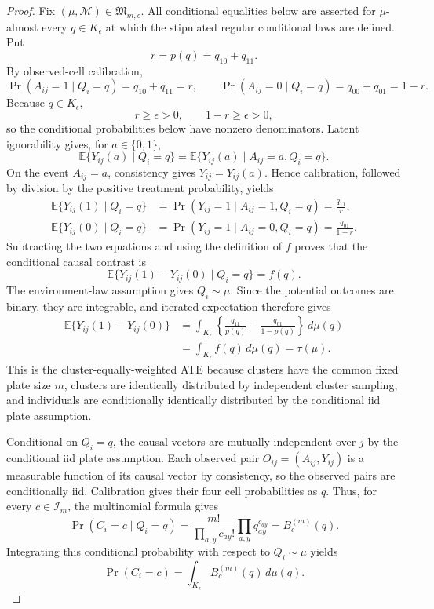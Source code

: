 \documentclass{article}
\begin{document}
\begin{proof}
Fix \((\mu,\mathcal M)\in\mathfrak M_{m,\epsilon}\). All conditional equalities below are asserted for \(\mu\)-almost every \(q\in K_{\epsilon}\) at which the stipulated regular conditional laws are defined. Put
\[
 r=p(q)=q_{10}+q_{11}.
\]
By observed-cell calibration,
\[
 \Pr(A_{ij}=1\mid Q_i=q)=q_{10}+q_{11}=r,
 \qquad
 \Pr(A_{ij}=0\mid Q_i=q)=q_{00}+q_{01}=1-r.
\]
Because \(q\in K_{\epsilon}\),
\[
 r\geq\epsilon>0,
 \qquad
 1-r\geq\epsilon>0,
\]
so the conditional probabilities below have nonzero denominators. Latent ignorability gives, for \(a\in\{0,1\}\),
\[
 \mathbb E\{Y_{ij}(a)\mid Q_i=q\}
 =\mathbb E\{Y_{ij}(a)\mid A_{ij}=a,Q_i=q\}.
\]
On the event \(A_{ij}=a\), consistency gives \(Y_{ij}=Y_{ij}(a)\). Hence calibration, followed by division by the positive treatment probability, yields
\[
 \begin{aligned}
 \mathbb E\{Y_{ij}(1)\mid Q_i=q\}
 &=\Pr(Y_{ij}=1\mid A_{ij}=1,Q_i=q)
 =\frac{q_{11}}{r},\\
 \mathbb E\{Y_{ij}(0)\mid Q_i=q\}
 &=\Pr(Y_{ij}=1\mid A_{ij}=0,Q_i=q)
 =\frac{q_{01}}{1-r}.
 \end{aligned}
\]
Subtracting the two equations and using the definition of \(f\) proves that the conditional causal contrast is
\[
 \mathbb E\{Y_{ij}(1)-Y_{ij}(0)\mid Q_i=q\}=f(q).
\]
The environment-law assumption gives \(Q_i\sim\mu\). Since the potential outcomes are binary, they are integrable, and iterated expectation therefore gives
\[
 \begin{aligned}
 \mathbb E\{Y_{ij}(1)-Y_{ij}(0)\}
 &=\int_{K_{\epsilon}}
 \left\{\frac{q_{11}}{p(q)}-\frac{q_{01}}{1-p(q)}\right\}\,d\mu(q)\\
 &=\int_{K_{\epsilon}}f(q)\,d\mu(q)
 =\tau(\mu).
 \end{aligned}
\]
This is the cluster-equally-weighted ATE because clusters have the common fixed plate size \(m\), clusters are identically distributed by independent cluster sampling, and individuals are conditionally identically distributed by the conditional iid plate assumption.

Conditional on \(Q_i=q\), the causal vectors are mutually independent over \(j\) by the conditional iid plate assumption. Each observed pair \(O_{ij}=(A_{ij},Y_{ij})\) is a measurable function of its causal vector by consistency, so the observed pairs are conditionally iid. Calibration gives their four cell probabilities as \(q\). Thus, for every \(c\in\mathcal I_m\), the multinomial formula gives
\[
 \Pr(C_i=c\mid Q_i=q)
 =\frac{m!}{\prod_{a,y}c_{ay}!}\prod_{a,y}q_{ay}^{c_{ay}}
 =B_c^{(m)}(q).
\]
Integrating this conditional probability with respect to \(Q_i\sim\mu\) yields
\[
 \Pr(C_i=c)=\int_{K_{\epsilon}}B_c^{(m)}(q)\,d\mu(q).
\]


\end{proof}
\end{document}
